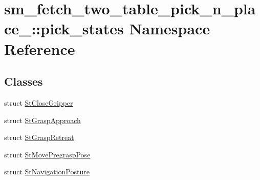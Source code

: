 \hypertarget{namespacesm__fetch__two__table__pick__n__place__1_1_1pick__states}{}\section{sm\+\_\+fetch\+\_\+two\+\_\+table\+\_\+pick\+\_\+n\+\_\+place\+\_\+:\+:pick\+\_\+states Namespace Reference}
\label{namespacesm__fetch__two__table__pick__n__place__1_1_1pick__states}
\subsection*{Classes}
\begin{DoxyCompactItemize}
\item 
struct \hyperlink{structsm__fetch__two__table__pick__n__place__1_1_1pick__states_1_1StCloseGripper}{St\+Close\+Gripper}
\item 
struct \hyperlink{structsm__fetch__two__table__pick__n__place__1_1_1pick__states_1_1StGraspApproach}{St\+Grasp\+Approach}
\item 
struct \hyperlink{structsm__fetch__two__table__pick__n__place__1_1_1pick__states_1_1StGraspRetreat}{St\+Grasp\+Retreat}
\item 
struct \hyperlink{structsm__fetch__two__table__pick__n__place__1_1_1pick__states_1_1StMovePregraspPose}{St\+Move\+Pregrasp\+Pose}
\item 
struct \hyperlink{structsm__fetch__two__table__pick__n__place__1_1_1pick__states_1_1StNavigationPosture}{St\+Navigation\+Posture}
\end{DoxyCompactItemize}
